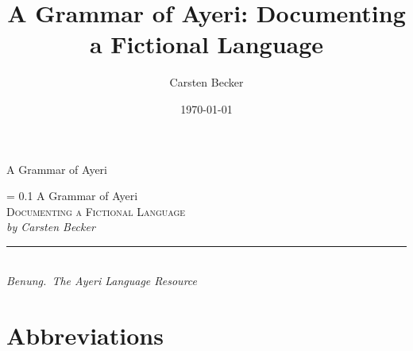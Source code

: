 \documentclass[
	a4paper,
	12pt,
	openany,
	twoside,
	oldfontcommands, %
]{memoir}
\author{Carsten Becker}
\title{A Grammar of Ayeri: Documenting a Fictional Language}
\date{\today}
\newlength\drop
\newcommand*{\titleS}{\begingroup%
\drop = 0.1\textheight
\centering
\vspace*{\drop}
{\Huge A Grammar of Ayeri}\\[\baselineskip]
{\Large\scshape Documenting a Fictional Language}\\[\baselineskip]
{\large\itshape by Carsten Becker}\\[\baselineskip]
\vfill
\rule{0.4\textwidth}{0.4pt}\\[\baselineskip]
{\large\itshape Benung.~The Ayeri Language Resource}\par
\vspace*{\drop}
\endgroup}
\begin{document}

\begin{titlingpage}
\begin{center}
{\Huge A Grammar of Ayeri}
\end{center}
\end{titlingpage}


\begin{titlingpage}
\titleS
\clearpage

\end{titlingpage}


\frontmatter
\begin{KeepFromToc}
  \tableofcontents
\end{KeepFromToc}
\clearpage
\listoffigures
\clearpage
\listoftables
\chapter{Abbreviations}
\begin{multicols}{2}
\printglossary[style=mysuper,type=\leipzigtype]
\end{multicols}
\cleartorecto


\cleartorecto


\mainmatter


\cleartorecto


\cleartorecto


\cleartorecto


\cleartorecto


\cleartorecto


\cleartorecto


\appendix
\cleartorecto


\cleartorecto


\printbibliography


\backmatter
\printindex

\end{document}

